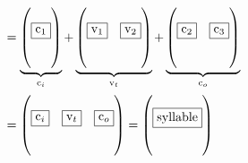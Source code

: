 \begin{align}
    \textbf{\Huge } &= 
    \underbrace{
        \begin{pmatrix}\pmb{\text{\Large }}\\\boxed{\mathrm{c}_1}\\\mathrm{}\\\mathrm{}\end{pmatrix}
    }_{\mathrm{c}_i}
    +
    \underbrace{
        \begin{pmatrix}             
            \pmb{\text{\Large }} & \pmb{\text{\Large }}\\
            \boxed{\mathrm{v}_1} & \boxed{\mathrm{v}_2}\\
            \mathrm{} & \mathrm{}\\
            \mathrm{} & \mathrm{}
            \end{pmatrix}
    }_{\mathrm{v}_t}
        +
    \underbrace{
        \begin{pmatrix}
            \pmb{\text{\Large }} & \pmb{\text{\Large }}\\
            \boxed{\mathrm{c}_2} & \boxed{\mathrm{c}_3}\\
            \mathrm{} & \mathrm{}\\
            \mathrm{} & \mathrm{}
        \end{pmatrix}
    }_{\mathrm{c}_o}
    \\&=
    \begin{pmatrix}
        \pmb{\text{\Large }} & \pmb{\text{\Large }} & \pmb{\text{\Large }}\\
        \boxed{\mathrm{c}_i} & \boxed{\mathrm{v}_t} & \boxed{\mathrm{c}_o}\\
        \mathrm{} & \mathrm{} & \mathrm{}\\
        \mathrm{} & \mathrm{} & \mathrm{}
    \end{pmatrix}
    =
    \begin{pmatrix}\pmb{\text{\Large }}\\\boxed{\mathrm{syllable}}\\\mathrm{}\\\mathrm{}\end{pmatrix}
\end{align}

